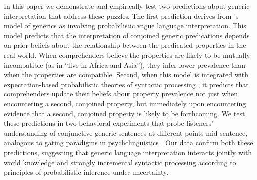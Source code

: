 \documentclass[10pt,letterpaper]{article}
\begin{document}
In this paper we demonstrate and empirically test two predictions about generic interpretation that address these puzzles.  The first prediction derives from \cite{Tessler2019:genLang}'s model of generics as involving probabilistic  vague language interpretation.  This model predicts that the interpretation of conjoined generic predications depends on prior beliefs about the relationship between the predicated properties in the real world.  When comprehenders believe the properties are likely to be mutually incompatible (as in ``live in Africa and Asia''), they infer lower prevalence than when the properties are compatible.  Second, when this model is integrated with expectation-based probabilistic theories of syntactic processing \cite{hale:2001,Levy2008}, it predicts that comprehenders update their beliefs about property prevalence not just when encountering a second, conjoined property, but immediately upon encountering evidence that a second, conjoined property is likely to be forthcoming.  We test these predictions in two behavioral experiments that probe listeners' understanding of conjunctive generic sentences at different points mid-sentence, analogous to gating paradigms in psycholinguistics \cite{Grosjean1980}.  Our data confirm both these predictions, suggesting that generic language interpretation interacts jointly with world knowledge and strongly incremental syntactic processing according to principles of probabilistic inference under uncertainty.
 
\end{document}
